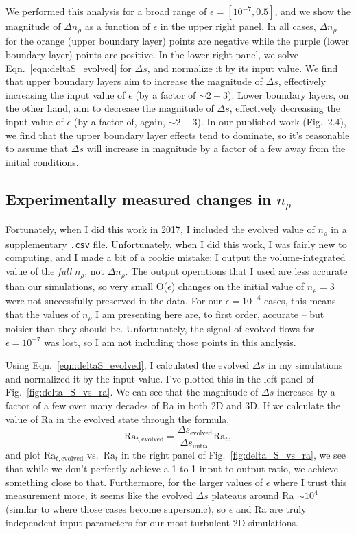 \documentclass[aps, pre, onecolumn, nofootinbib, notitlepage, groupedaddress, amsfonts, amssymb, amsmath, longbibliography, superscriptaddress]{revtex4-1}
\begin{document}
We performed this analysis for a broad range of $\epsilon = [10^{-7}, 0.5]$, and we show the magnitude of $\Delta n_\rho$ as a function of $\epsilon$ in the upper right panel.
In all cases, $\Delta n_\rho$ for the orange (upper boundary layer) points are negative while the purple (lower boundary layer) points are positive.
In the lower right panel, we solve Eqn.~\ref{eqn:deltaS_evolved} for $\Delta s$, and normalize it by its input value.
We find that upper boundary layers aim to increase the magnitude of $\Delta s$, effectively increasing the input value of $\epsilon$ (by a factor of $\sim 2-3$).
Lower boundary layers, on the other hand, aim to decrease the magnitude of $\Delta s$, effectively decreasing the input value of $\epsilon$ (by a factor of, again, $\sim 2-3$).
In our published work (Fig.~2.4), we find that the upper boundary layer effects tend to dominate, so it's reasonable to assume that $\Delta s$ will increase in magnitude by a factor of a few away from the initial conditions.

\subsection{Experimentally measured changes in $n_\rho$}
Fortunately, when I did this work in 2017, I included the evolved value of $n_\rho$ in a supplementary \texttt{.csv} file.
Unfortunately, when I did this work, I was fairly new to computing, and I made a bit of a rookie mistake: I output the volume-integrated value of the \emph{full} $n_\rho$, not $\Delta n_\rho$.
The output operations that I used are less accurate than our simulations, so very small O($\epsilon$) changes on the initial value of $n_\rho = 3$ were not successfully preserved in the data.
For our $\epsilon = 10^{-4}$ cases, this means that the values of $n_\rho$ I am presenting here are, to first order, accurate -- but noisier than they should be.
Unfortunately, the signal of evolved flows for $\epsilon = 10^{-7}$ was lost, so I am not including those points in this analysis.

Using Eqn.~\ref{eqn:deltaS_evolved}, I calculated the evolved $\Delta s$ in my simulations and normalized it by the input value.
I've plotted this in the left panel of Fig.~\ref{fig:delta_S_vs_ra}.
We can see that the magnitude of $\Delta s$ increases by a factor of a few over many decades of Ra in both 2D and 3D.
If we calculate the value of Ra in the evolved state through the formula,
$$
\text{Ra}_{t, \text{evolved}} = \frac{\Delta s_{\text{evolved}}}{\Delta s_{\text{initial}}} \text{Ra}_{t},
$$
and plot $\text{Ra}_{t, \text{evolved}}$ vs.~$\text{Ra}_{t}$ in the right panel of Fig.~\ref{fig:delta_S_vs_ra}, we see that while we don't perfectly achieve a 1-to-1 input-to-output ratio, we achieve something close to that.
Furthermore, for the larger values of $\epsilon$ where I trust this measurement more, it seems like the evolved $\Delta s$ plateaus around Ra $\sim 10^4$ (similar to where those cases become supersonic), so $\epsilon$ and Ra are truly independent input parameters for our most turbulent 2D simulations.
\end{document}
